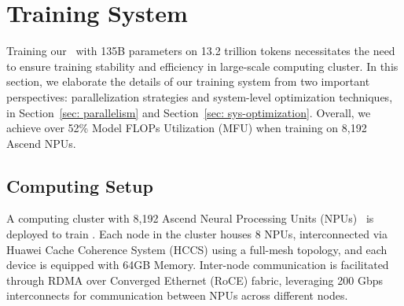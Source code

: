 \section{Training System}
Training our \modelname~with 135B parameters on 13.2 trillion tokens necessitates the need to ensure training stability and efficiency in large-scale computing cluster.
In this section, we elaborate the details of our training system from two important perspectives: parallelization strategies and system-level optimization techniques, in Section~\ref{sec: parallelism} and Section~\ref{sec: sys-optimization}. 
Overall, we achieve over 52\% Model FLOPs Utilization (MFU) when training \modelname{} on 8,192 Ascend NPUs.




\subsection{Computing Setup}
A computing cluster with 8,192 Ascend Neural Processing Units (NPUs)~\cite{910b2, 910b2-technical} is deployed to train \modelname.
Each node in the cluster houses 8 NPUs, interconnected via Huawei Cache Coherence System (HCCS) using a full-mesh topology, and each device is equipped with 64GB Memory.
Inter-node communication is facilitated through RDMA over Converged Ethernet (RoCE) fabric, leveraging 200 Gbps interconnects for communication between NPUs across different nodes.

